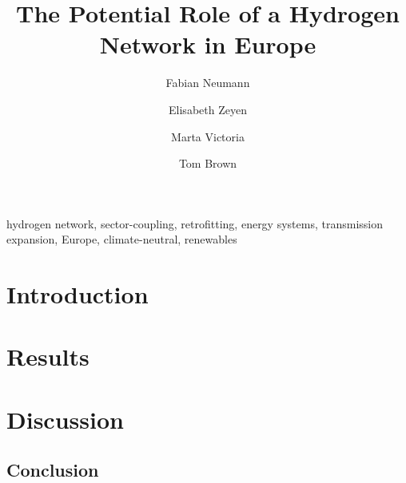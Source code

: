 \documentclass[3p]{elsarticle}
\begin{document}
\begin{frontmatter}

	\title{The Potential Role of a Hydrogen Network in Europe}

	\author[tubaddress]{Fabian Neumann}
	\author[tubaddress]{Elisabeth Zeyen}
	\author[aarhus,aarhus2]{Marta Victoria}
	\author[tubaddress]{Tom Brown}
	\address[tubaddress]{Department of Digital Transformation in Energy Systems, Institute of Energy Technology, Technische Universität Berlin, Fakultät III, Einsteinufer 25 (TA 8), 10587 Berlin, Germany}
	\address[aarhus]{Department of Mechanical and Production Engineering, Aarhus University, Inge Lehmanns Gade 10, 8000 Aarhus, Denmark}
	\address[aarhus2]{Novo Nordisk Foundation CO$_2$ Research Center, Gustav Wieds Vej 10, 8000 Aarhus, Denmark}

	\begin{abstract}
		
	\end{abstract}

	\begin{keyword}
		hydrogen network, sector-coupling, retrofitting, energy systems, transmission expansion, Europe, climate-neutral, renewables
	\end{keyword}

\end{frontmatter}

\section*{Introduction}
\label{sec:intro}



\section*{Results}




\section*{Discussion}
\label{sec:discussion}



\subsection*{Conclusion}
\label{sec:conclusion}
\end{document}
